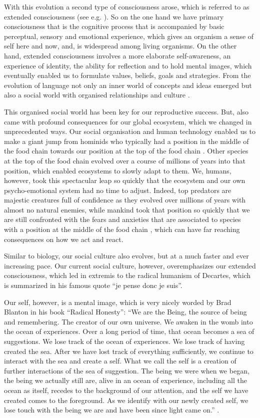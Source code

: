 \documentclass[
  11pt,
]{book}
\begin{document}
With this evolution a second type of consciousness arose, which is referred to as extended consciousness (see e.g. \citet{capraLuisi2014}). So on the one hand we have primary consciousness that is the cognitive process that is accompanied by basic perceptual, sensory and emotional experience, which gives an organism a sense of self here and now, and, is widespread among living organisms. On the other hand, extended consciousness involves a more elaborate self-awareness, an experience of identity, the ability for reflection and to hold mental images, which eventually enabled us to formulate values, beliefs, goals and strategies. From the evolution of language not only an inner world of concepts and ideas emerged but also a social world with organised relationships and culture \citep{capraLuisi2014}.

This organised social world has been key for our reproductive success. But, also came with profound consequences for our global ecosystem, which we changed in unprecedented ways. Our social organisation and human technology enabled us to make a giant jump from hominids who typically had a position in the middle of the food chain towards our position at the top of the food chain \citep{Harari2015}. Other species at the top of the food chain evolved over a course of millions of years into that position, which enabled ecosystems to slowly adapt to them. We, humans, however, took this spectacular leap so quickly that the ecosystem and our own psycho-emotional system had no time to adjust. Indeed, top predators are majestic creatures full of confidence as they evolved over millions of years with almost no natural enemies, while mankind took that position so quickly that we are still confronted with the fears and anxieties that are associated to species with a position at the middle of the food chain \citep{Harari2015}, which can have far reaching consequences on how we act and react.

Similar to biology, our social culture also evolves, but at a much faster and ever increasing pace.
Our current social culture, however, overemphasizes our extended consciousness, which led in extremis to the radical humanism of Decartes, which is summarized in his famous quote ``je pense donc je suis''.

Our self, however, is a mental image, which is very nicely worded by Brad Blanton in his book ``Radical Honesty'': ``We are the Being, the source of being and remembering. The creator of our own universe. We awaken in the womb into the ocean of experiences. Over a long period of time, that ocean becomes a sea of suggestions. We lose track of the ocean of experiences. We lose track of having created the sea. After we have lost track of everything sufficiently, we continue to interact with the sea and create a self. What we call the self is a creation of further interactions of the sea of suggestion. The being we were when we began, the being we actually still are, alive in an ocean of experience, including all the ocean as itself, recedes to the background of our attention, and the self we have created comes to the foreground. As we identify with our newly created self, we lose touch with the being we are and have been since light came on.'' \citep{Blanton1996}.
\end{document}
